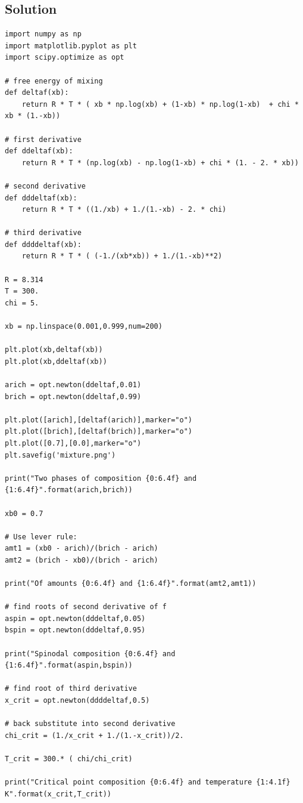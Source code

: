 \documentclass[11pt]{article}
\begin{document}
\subsection{Solution}
\label{sec:orgf03013c}
\begin{verbatim}
import numpy as np
import matplotlib.pyplot as plt
import scipy.optimize as opt

# free energy of mixing
def deltaf(xb):
    return R * T * ( xb * np.log(xb) + (1-xb) * np.log(1-xb)  + chi * xb * (1.-xb))

# first derivative
def ddeltaf(xb):
    return R * T * (np.log(xb) - np.log(1-xb) + chi * (1. - 2. * xb))

# second derivative
def dddeltaf(xb):
    return R * T * ((1./xb) + 1./(1.-xb) - 2. * chi)

# third derivative
def ddddeltaf(xb):
    return R * T * ( (-1./(xb*xb)) + 1./(1.-xb)**2)

R = 8.314
T = 300.
chi = 5.

xb = np.linspace(0.001,0.999,num=200)

plt.plot(xb,deltaf(xb))
plt.plot(xb,ddeltaf(xb))

arich = opt.newton(ddeltaf,0.01)
brich = opt.newton(ddeltaf,0.99)

plt.plot([arich],[deltaf(arich)],marker="o")
plt.plot([brich],[deltaf(brich)],marker="o")
plt.plot([0.7],[0.0],marker="o")
plt.savefig('mixture.png')

print("Two phases of composition {0:6.4f} and {1:6.4f}".format(arich,brich))

xb0 = 0.7

# Use lever rule:
amt1 = (xb0 - arich)/(brich - arich)
amt2 = (brich - xb0)/(brich - arich)

print("Of amounts {0:6.4f} and {1:6.4f}".format(amt2,amt1))

# find roots of second derivative of f
aspin = opt.newton(dddeltaf,0.05)
bspin = opt.newton(dddeltaf,0.95)

print("Spinodal composition {0:6.4f} and {1:6.4f}".format(aspin,bspin))

# find root of third derivative
x_crit = opt.newton(ddddeltaf,0.5)

# back substitute into second derivative
chi_crit = (1./x_crit + 1./(1.-x_crit))/2.

T_crit = 300.* ( chi/chi_crit)

print("Critical point composition {0:6.4f} and temperature {1:4.1f} K".format(x_crit,T_crit))
\end{verbatim}
\end{document}
